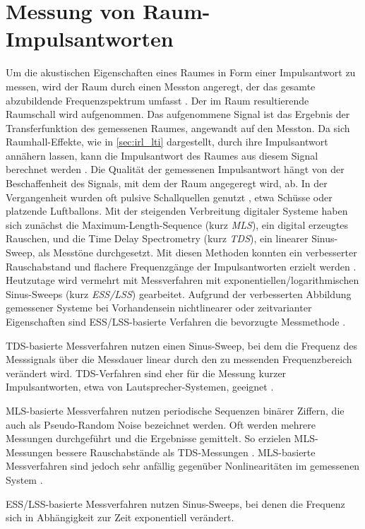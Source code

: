 \section{Messung von Raum-Impulsantworten}
\label{sec:ir_msrmt}
Um die akustischen Eigenschaften eines Raumes in Form einer Impulsantwort zu messen, wird der Raum
durch einen Messton angeregt, der das gesamte abzubildende Frequenzspektrum umfasst \cite{smpm2001}.
Der im Raum resultierende Raumschall wird aufgenommen.
Das aufgenommene Signal ist das Ergebnis der Transferfunktion des gemessenen Raumes,
angewandt auf den Messton. Da sich Raumhall-Effekte, wie in \ref{sec:irl_lti} dargestellt, durch ihre Impulsantwort annähern lassen, kann die Impulsantwort des Raumes
aus diesem Signal berechnet werden \cite{novak2016}. Die Qualität der gemessenen Impulsantwort hängt von der Beschaffenheit des Signals, mit dem der Raum angegeregt wird, ab.
In der Vergangenheit wurden oft pulsive Schallquellen genutzt \cite{farina2007b}, etwa Schüsse oder platzende Luftballons. Mit der steigenden Verbreitung digitaler Systeme
haben sich zunächst die Maximum-Length-Sequence (kurz \textit{MLS}), ein digital erzeugtes Rauschen, und die Time Delay Spectrometry (kurz \textit{TDS}),
ein linearer Sinus-Sweep, als Messtöne durchgesetzt. Mit diesen Methoden konnten ein verbesserter Rauschabstand und flachere Frequenzgänge der Impulsantworten erzielt werden \cite{farina2007b}.
Heutzutage wird vermehrt mit Messverfahren mit exponentiellen/logarithmischen Sinus-Sweeps (kurz \textit{ESS/LSS}) gearbeitet.
Aufgrund der verbesserten Abbildung gemessener Systeme bei Vorhandensein nichtlinearer oder zeitvarianter Eigenschaften sind ESS/LSS-basierte Verfahren die bevorzugte Messmethode \cite{farina2007b}.

TDS-basierte Messverfahren nutzen einen Sinus-Sweep, bei dem die Frequenz des Messsignals über die Messdauer linear durch den zu messenden
Frequenzbereich verändert wird. TDS-Verfahren sind eher für die Messung kurzer Impulsantworten, etwa von Lautsprecher-Systemen, geeignet \cite{farina2000, holters2009}.

MLS-basierte Messverfahren nutzen periodische Sequenzen binärer Ziffern, die auch als Pseudo-Random Noise bezeichnet werden.
Oft werden mehrere Messungen durchgeführt und die Ergebnisse gemittelt. So erzielen MLS-Messungen bessere Rauschabstände als TDS-Messungen  \cite{rife1989}.
MLS-basierte Messverfahren sind jedoch sehr anfällig gegenüber Nonlinearitäten im gemessenen System \cite{holters2009}.

ESS/LSS-basierte Messverfahren nutzen Sinus-Sweeps, bei denen die Frequenz sich in Abhängigkeit zur Zeit exponentiell verändert. 

